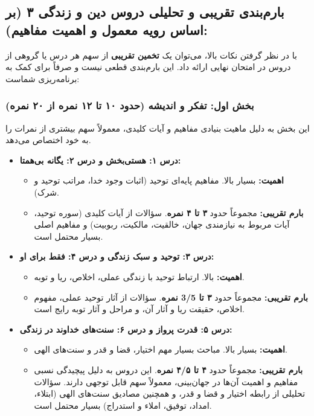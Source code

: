\documentclass[11pt,a4paper]{article}
\begin{document}
\subsection*{بارم‌بندی تقریبی و تحلیلی دروس دین و زندگی ۳ (بر اساس رویه معمول و اهمیت مفاهیم):}

با در نظر گرفتن نکات بالا، می‌توان یک \textbf{تخمین تقریبی} از سهم هر درس یا گروهی از دروس در امتحان نهایی ارائه داد. این بارم‌بندی قطعی نیست و صرفاً برای کمک به برنامه‌ریزی شماست:

\subsubsection*{بخش اول: تفکر و اندیشه (حدود ۱۰ تا ۱۲ نمره از ۲۰ نمره)}
این بخش به دلیل ماهیت بنیادی مفاهیم و آیات کلیدی، معمولاً سهم بیشتری از نمرات را به خود اختصاص می‌دهد.

\begin{itemize}
    \item \textbf{درس ۱: هستی‌بخش و درس ۲: یگانه بی‌همتا:}
    \begin{itemize}
        \item \textbf{اهمیت:} بسیار بالا. مفاهیم پایه‌ای توحید (اثبات وجود خدا، مراتب توحید و شرک).
        \item \textbf{بارم تقریبی:} مجموعاً حدود \textbf{۳ تا ۴ نمره}. سؤالات از آیات کلیدی (سوره توحید، آیات مربوط به نیازمندی جهان، خالقیت، مالکیت، ربوبیت) و مفاهیم اصلی بسیار محتمل است.
    \end{itemize}
    \item \textbf{درس ۳: توحید و سبک زندگی و درس ۴: فقط برای او:}
    \begin{itemize}
        \item \textbf{اهمیت:} بالا. ارتباط توحید با زندگی عملی، اخلاص، ریا و توبه.
        \item \textbf{بارم تقریبی:} مجموعاً حدود \textbf{۳ تا 3/5 نمره}. سؤالات از آثار توحید عملی، مفهوم اخلاص، حقیقت ریا و آثار آن، و مراحل و آثار توبه رایج است.
    \end{itemize}
    \item \textbf{درس ۵: قدرت پرواز و درس ۶: سنت‌های خداوند در زندگی:}
    \begin{itemize}
        \item \textbf{اهمیت:} بسیار بالا. مباحث بسیار مهم اختیار، قضا و قدر و سنت‌های الهی.
        \item \textbf{بارم تقریبی:} مجموعاً حدود \textbf{۴ تا ۴/۵ نمره}. این دروس به دلیل پیچیدگی نسبی مفاهیم و اهمیت آن‌ها در جهان‌بینی، معمولاً سهم قابل توجهی دارند. سؤالات تحلیلی از رابطه اختیار و قضا و قدر، و همچنین مصادیق سنت‌های الهی (ابتلاء، امداد، توفیق، املاء و استدراج) بسیار محتمل است.
    \end{itemize}
\end{itemize}
\end{document}
